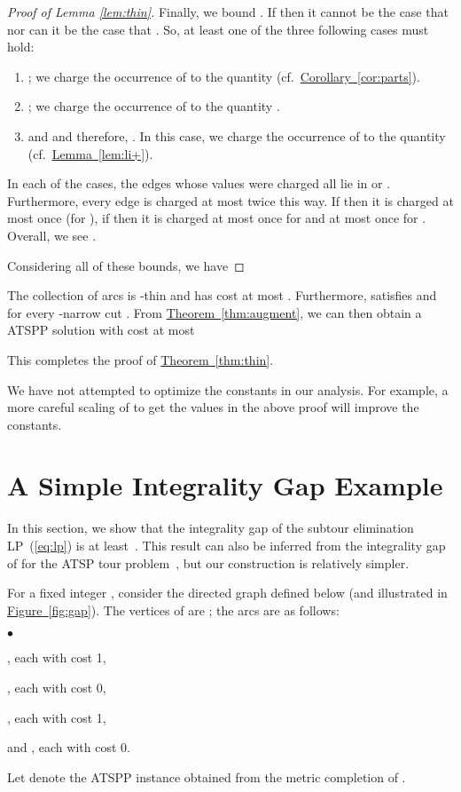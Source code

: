 \documentclass[11pt]{article}
\newcommand{\lref}[2][]{\hyperref[#2]{#1~\ref*{#2}}}
\theoremstyle{definition}
\newcounter{note}[section]
\newcommand{\initOneLiners}{\setlength{\itemsep}{0pt}
    \setlength{\parsep }{0pt}
    \setlength{\topsep }{0pt}
}
\newenvironment{OneLiners}[1][\ensuremath{\bullet}]
    {\begin{list}
        {#1}
        {\initOneLiners}}
    {\end{list}}
\begin{document}
\begin{proof}[Proof of Lemma \ref{lem:thin}]
Finally, we bound . If  then it cannot be the case that  nor can it be the case that .
So, at least one of the three following cases must hold:
\begin{enumerate}
\item ; we charge the occurrence of  to the quantity 
(cf.\ \lref[Corollary]{cor:parts}).
\item ; we charge the occurrence of  to the quantity .
\item  and  and therefore, . In this case, we charge the occurrence of  to the quantity 
(cf.\ \lref[Lemma]{lem:li+}).
\end{enumerate}
In each of the cases, the edges whose  values were charged all lie in  or . Furthermore, every edge is charged at most twice
this way. If  then it is charged at most once (for ), if  then it is charged at most once for  and at most
once for . Overall, we see .

Considering all of these bounds, we have

\end{proof}

The collection of arcs  is -thin and has cost at most .
Furthermore,  satisfies  and  for every  -narrow  cut .
From \lref[Theorem]{thm:augment}, we can then obtain a ATSPP solution with cost at most

This completes the proof of \lref[Theorem]{thm:thin}.

We have not attempted to optimize the constants in our analysis. For example, a more careful scaling of  to get the  values
in the above proof will improve the constants.



\section{A Simple Integrality Gap Example}
\label{sec:int-gap}

In this section, we show that the integrality gap of the subtour
elimination LP~(\ref{eq:lp}) is at least~. This result can also be
inferred from the integrality gap of  for the ATSP tour
problem~\cite{CGK06}, but our construction is relatively simpler.

For a fixed integer , consider the directed graph 
defined below (and illustrated in \lref[Figure]{fig:gap}). The vertices of
 are ;
the arcs are as follows:
\begin{OneLiners}
\item , each with cost 1,
\item , each with cost 0,
\item ,
  each with cost 1,
\item and , each with cost 0.
\end{OneLiners}
Let  denote the ATSPP instance obtained from the metric completion
of .
\end{document}
